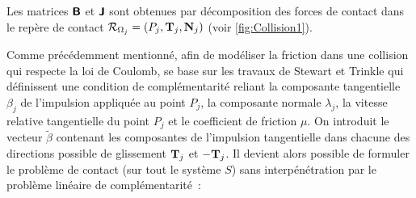 Les matrices $\bm{\mathsf{B}}$ et $\bm{\mathsf{J}}$ sont obtenues par décomposition des forces de contact dans le repère de contact $\mathcal{R}_{\Omega_j} = (P_j, \bm{\mathrm{T}}_j, \bm{\mathrm{N}}_j)$ (voir \cref{fig:Collision1}).

Comme précédemment mentionné, afin de modéliser la friction dans une collision qui respecte la loi de Coulomb, \parencite{rabatel2015thesis} se base sur les travaux de Stewart et Trinkle \parencite{stewart1996implicit} qui définissent une condition de complémentarité reliant la composante tangentielle $\beta_j$ de l'impulsion appliquée au point $P_j$, la composante normale $\lambda_j$, la vitesse relative tangentielle du point $P_j$ et le coefficient de friction $\mu$. On introduit le vecteur $\tilde{\beta}$ contenant les composantes de l'impulsion tangentielle dans chacune des directions possible de glissement $\bm{\mathrm{T}}_j$ et $-\bm{\mathrm{T}}_j$. Il devient alors possible de formuler le problème de contact (sur tout le système $S$) sans interpénétration par le problème linéaire de complémentarité :
